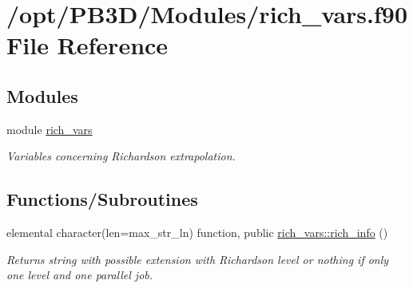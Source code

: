 \hypertarget{rich__vars_8f90}{}\section{/opt/\+P\+B3\+D/\+Modules/rich\+\_\+vars.f90 File Reference}
\label{rich__vars_8f90}
\subsection*{Modules}
\begin{DoxyCompactItemize}
\item 
module \hyperlink{namespacerich__vars}{rich\+\_\+vars}
\begin{DoxyCompactList}\small\item\em Variables concerning Richardson extrapolation. \end{DoxyCompactList}\end{DoxyCompactItemize}
\subsection*{Functions/\+Subroutines}
\begin{DoxyCompactItemize}
\item 
elemental character(len=max\+\_\+str\+\_\+ln) function, public \hyperlink{namespacerich__vars_a4f54d3fc0ac510fc073220794ee4fa37}{rich\+\_\+vars\+::rich\+\_\+info} ()
\begin{DoxyCompactList}\small\item\em Returns string with possible extension with Richardson level or nothing if only one level and one parallel job. \end{DoxyCompactList}\end{DoxyCompactItemize}
